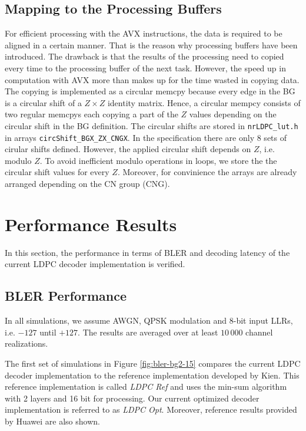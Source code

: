 \documentclass{article}
\begin{document}
\subsection{Mapping to the Processing Buffers}
\label{sec:mapp-cn-proc}

For efficient processing with the AVX instructions, the data is required to be aligned in a certain manner. That is the reason why processing buffers have been introduced. The drawback is that the results of the processing need to copied every time to the processing buffer of the next task. However, the speed up in computation with AVX more than makes up for the time wasted in copying data. The copying is implemented as a circular memcpy because every edge in the BG is a circular shift of a $Z\times Z$ identity matrix. Hence, a circular mempcy consists of two regular memcpys each copying a part of the $Z$ values depending on the circular shift in the BG definition. The circular shifts are stored in \texttt{nrLDPC\_lut.h} in arrays \texttt{circShift\_BGX\_ZX\_CNGX}. In the specification there are only 8 sets of cirular shifts defined. However, the applied circular shift depends on $Z$, i.e. modulo $Z$. To avoid inefficient modulo operations in loops, we store the the circular shift values for every $Z$. Moreover, for convinience the arrays are already arranged depending on the CN group (CNG).

\newpage
\section{Performance Results}
\label{sec:performance-results}

In this section, the performance in terms of BLER and decoding latency of the current LDPC decoder implementation is verified.

\subsection{BLER Performance}
\label{sec:bler-performance}

In all simulations, we assume AWGN, QPSK modulation and 8-bit input LLRs, i.e. $-127$ until $+127$. The results are averaged over at least $10\,000$ channel realizations.

The first set of simulations in Figure \ref{fig:bler-bg2-15} compares the current LDPC decoder implementation to the reference implementation developed by Kien. This reference implementation is called \textit{LDPC Ref} and uses the min-sum algorithm with 2 layers and 16 bit for processing. Our current optimized decoder implementation is referred to as \textit{LDPC Opt}. Moreover, reference results provided by Huawei are also shown.
\end{document}
